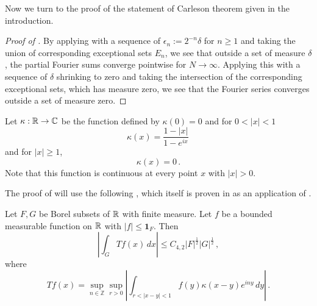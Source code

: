 Now we turn to the proof of the statement of Carleson theorem given in the introduction.
\begin{proof}[Proof of ]
\leanok
By applying  with a sequence of $\epsilon_n:= 2^{-n}\delta$ for $n\ge 1$ and taking the union
of corresponding exceptional sets $E_n$, we see that outside a set of measure $\delta$, the partial Fourier
sums converge pointwise for $N\to \infty$. Applying this with a sequence of $\delta$ shrinking to zero and
taking the intersection of the corresponding exceptional sets, which has measure zero, we see that the Fourier
series converges outside a set of measure zero.
\end{proof}

Let $\kappa:{\mathbb{R}}\to \mathbb{C}$ be the function defined by
$\kappa(0)=0$ and for $0<|x|<1$
\begin{equation}\label{eq-hilker}
\kappa(x)=\frac { 1-|x|}{1-e^{ix}}\,
\end{equation}
and for $|x|\ge 1$,
\begin{equation}\label{eq-hilker1}
\kappa(x)=0\, .
\end{equation}
Note that this function is continuous at every point $x$ with $|x|>0$.

The proof of  will
use the following , which itself is proven
 in  as an application of
 .
\begin{lemma}\label{real-Carleson}
\leanok
{}
    Let $F,G$ be Borel subsets of ${\mathbb{R}}$ with finite measure. Let $f$ be a bounded measurable function on ${\mathbb{R}}$ with $|f|\le \mathbf{1}_F$. Then
\begin{equation}
    \left|\int _G Tf(x) \, dx\right| \le C_{4,2} |F|^{\frac 12} |G|^{\frac 12} \, ,
\end{equation}
where
\begin{equation}
    \label{define-T-carleson}
    T f(x)=\sup_{n\in \mathbb{Z}}
    \sup_{r>0}\left|\int_{r<|x-y|<1} f(y)\kappa(x-y) e^{iny}\, dy\right|\, .
\end{equation}
\end{lemma}


